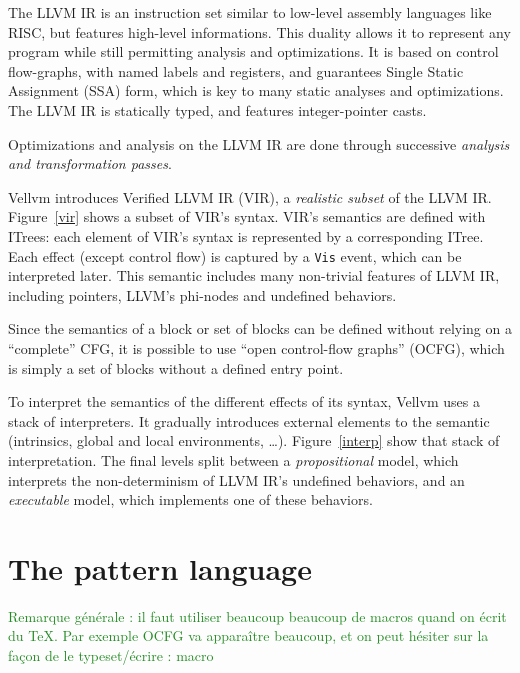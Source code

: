 \documentclass[11pt]{article}
\newcommand{\inlinecoq}[1]{\mbox{\lstinline[style=customcoq,columns=fixed,basewidth=.48em]{#1}}}
\newcommand{\ilc}[1]{\inlinecoq{#1}}
\newcommand{\yz}[1]{\textcolor{ForestGreen}{#1}}
\newcommand{\ocfg}{OCFG\xspace}
\begin{document}
The LLVM IR is an instruction set similar to low-level assembly languages like RISC, but features high-level informations. This duality allows it to represent any program while still permitting analysis and optimizations. It is based on control flow-graphs, with named labels and registers, and guarantees Single Static Assignment (SSA) form, which is key to many static analyses and optimizations. The LLVM IR is statically typed, and features integer-pointer casts.

Optimizations and analysis on the LLVM IR are done through successive \emph{analysis and transformation passes}.

Vellvm introduces Verified LLVM IR (VIR), a \emph{realistic subset} of the LLVM IR. Figure~\ref{vir} shows a subset of VIR's syntax. VIR's semantics are defined with ITrees: each element of VIR's syntax is represented by a corresponding ITree. Each effect (except control flow) is captured by a \ilc{Vis} event, which can be interpreted later. This semantic includes many non-trivial features of LLVM IR, including pointers, LLVM's phi-nodes and undefined behaviors.

Since the semantics of a block or set of blocks can be defined without relying on a ``complete'' CFG, it is possible to use ``open control-flow graphs'' (\ocfg), which is simply a set of blocks without a defined entry point.

To interpret the semantics of the different effects of its syntax, Vellvm uses a stack of interpreters. It gradually introduces external elements to the semantic (intrinsics, global and local environments, \ldots). Figure~\ref{interp} show that stack of interpretation. The final levels split between a \emph{propositional} model, which interprets the non-determinism of LLVM IR's undefined behaviors, and an \emph{executable} model, which implements one of these behaviors.

\section{The pattern language}
\label{sec:lang}


\yz{Remarque générale : il faut utiliser beaucoup beaucoup de macros quand on écrit du TeX. Par exemple OCFG va apparaître beaucoup, et on peut hésiter sur la façon de le typeset/écrire : macro }
\end{document}
